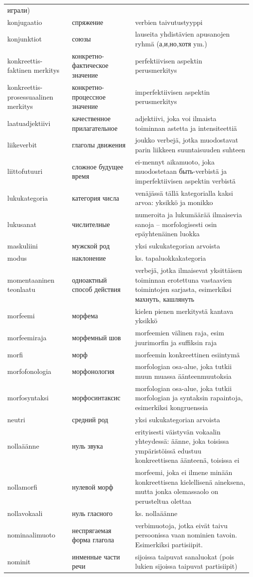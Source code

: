 \documentclass[]{scrreprt}
\begin{document}
\begin{longtable}[c]{p{4cm}p{4cm}p{7cm}}
играли)\tabularnewline
konjugaatio & спряжение & verbien taivutustyyppi\tabularnewline
konjunktiot & союзы & lauseita yhdistävien apusanojen ryhmä (а,и,но,хотя
ym.)\tabularnewline
konkreettis-faktinen merkitys & конкретно-фактическое значение &
perfektiivisen aspektin perusmerkitys\tabularnewline
konkreettis-prosessuaalinen merkitys & конкретно-процессное значение &
imperfektiivisen aspektin perusmerkitys\tabularnewline
laatuadjektiivi & качественное прилагательное & adjektiivi, joka voi
ilmaista toiminnan astetta ja intensiteettiä\tabularnewline
liikeverbit & глаголы движения & joukko verbejä, jotka muodostavat parin
liikkeen suuntaisuuden suhteen\tabularnewline
liittofutuuri & сложное будущее время & ei-mennyt aikamuoto, joka
muodostetaan быть-verbistä ja imperfektiivisen aspektin
verbistä\tabularnewline
lukukategoria & категория числа & venäjässä tällä kategorialla kaksi
arvoa: yksikkö ja monikko\tabularnewline
lukusanat & числителные & numeroita ja lukumäärää ilmaisevia sanoja --
morfologisesti osin epäyhtenäinen luokka\tabularnewline
maskuliini & мужской род & yksi sukukategorian arvoista\tabularnewline
modus & наклонение & ks. tapaluokkakategoria\tabularnewline
momentaaninen teonlaatu & одноактный способ действия & verbejä, jotka
ilmaisevat yksittäisen toiminnan erotettuna vastaavien toimintojen
sarjasta, esimerkiksi махнуть, кашлянуть\tabularnewline
morfeemi & морфема & kielen pienen merkitystä kantava
yksikkö\tabularnewline
morfeemiraja & морфемный шов & morfeemien välinen raja, esim juurimorfin
ja suffiksin raja\tabularnewline
morfi & морф & morfeemin konkreettinen esiintymä\tabularnewline
morfofonologia & морфонология & morfologian osa-alue, joka tutkii muun
muassa äänteenmuutoksia\tabularnewline
morfosyntaksi & морфосинтаксис & morfologian osa-alue, joka tutkii
morfologian ja syntaksin rapaintoja, esimerkiksi
kongruenssia\tabularnewline
neutri & средний род & yksi sukukategorian arvoista\tabularnewline
nollaäänne & нуль звука & erityisesti väistyvän vokaalin yhteydessä:
äänne, joka toisissa ympäristöissä edustuu konkreettisena äänteenä,
toisissa ei\tabularnewline
nollamorfi & нулевой морф & morfeemi, joka ei ilmene minään
konkreettisena kielellisenä aineksena, mutta jonka olemassaolo on
perusteltua olettaa\tabularnewline
nollavokaali & нуль гласного & ks. nollaäänne\tabularnewline
nominaalimuoto & неспрягаемая форма глагола & verbimuotoja, jotka eivät
taivu persoonissa vaan nominien tavoin. Esimerkiksi
partisiipit.\tabularnewline
nominit & инменные части речи & sijoissa taipuvat sanaluokat (pois
lukien sijoissa taipuvat partisiipit)\tabularnewline

\end{longtable}
\end{document}
